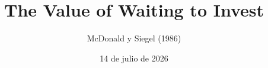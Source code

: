 \documentclass[11pt]{beamer}
\title{The Value of Waiting to Invest}
\subtitle{McDonald y Siegel (1986)}
\institute[Finanzas Matemáticas]{Finanzas Matemáticas}
\date{14 de julio de 2026}
\begin{document}
\begin{frame}
  \titlepage
\end{frame}





\end{document}
